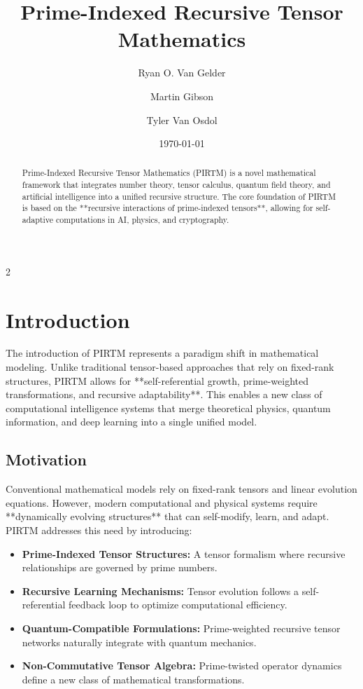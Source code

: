 \documentclass{article}
\theoremstyle{plain}
\begin{document}
\title{Prime-Indexed Recursive Tensor Mathematics}
\author[1]{Ryan O. Van Gelder}
\author[2]{Martin Gibson}
\author[3]{Tyler Van Osdol}
\date{\today}

\maketitle

\begin{abstract}
Prime-Indexed Recursive Tensor Mathematics (PIRTM) is a novel mathematical framework that integrates number theory, tensor calculus, quantum field theory, and artificial intelligence into a unified recursive structure. The core foundation of PIRTM is based on the **recursive interactions of prime-indexed tensors**, allowing for self-adaptive computations in AI, physics, and cryptography. 
\end{abstract}


\newpage
 \begin{multicols}{2}
\begin{singlespace}
\tableofcontents
\end{singlespace}
\end{multicols}
 \newpage

\section{Introduction}
The introduction of PIRTM represents a paradigm shift in mathematical modeling. Unlike traditional tensor-based approaches that rely on fixed-rank structures, PIRTM allows for **self-referential growth, prime-weighted transformations, and recursive adaptability**. This enables a new class of computational intelligence systems that merge theoretical physics, quantum information, and deep learning into a single unified model.

\subsection{Motivation}
Conventional mathematical models rely on fixed-rank tensors and linear evolution equations. However, modern computational and physical systems require **dynamically evolving structures** that can self-modify, learn, and adapt. PIRTM addresses this need by introducing:
\begin{itemize}
    \item \textbf{Prime-Indexed Tensor Structures:} A tensor formalism where recursive relationships are governed by prime numbers.
    \item \textbf{Recursive Learning Mechanisms:} Tensor evolution follows a self-referential feedback loop to optimize computational efficiency.
    \item \textbf{Quantum-Compatible Formulations:} Prime-weighted recursive tensor networks naturally integrate with quantum mechanics.
    \item \textbf{Non-Commutative Tensor Algebra:} Prime-twisted operator dynamics define a new class of mathematical transformations.
\end{itemize}
\end{document}
